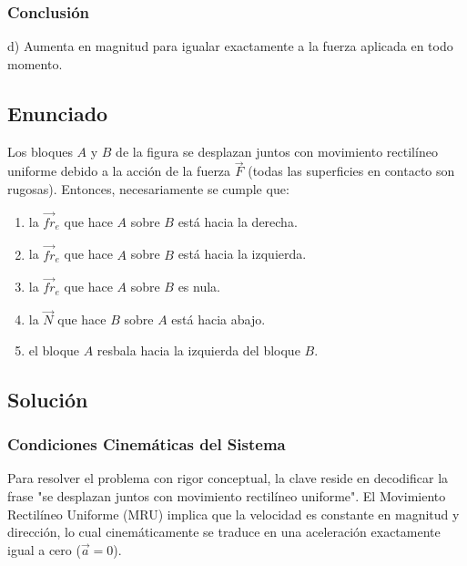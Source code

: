 \documentclass[12pt]{article}
\begin{document}
\subsubsection*{Conclusión}
d) Aumenta en magnitud para igualar exactamente a la fuerza aplicada en todo momento.

\newpage

\subsection*{Enunciado}
Los bloques $A$ y $B$ de la figura se desplazan juntos con movimiento rectilíneo uniforme debido a la acción de la fuerza $\vec{F}$ (todas las superficies en contacto son rugosas). Entonces, necesariamente se cumple que:
\begin{enumerate}
    \item[a)] la $\vec{fr}_e$ que hace $A$ sobre $B$ está hacia la derecha.
    \item[b)] la $\vec{fr}_e$ que hace $A$ sobre $B$ está hacia la izquierda.
    \item[c)] la $\vec{fr}_e$ que hace $A$ sobre $B$ es nula.
    \item[d)] la $\vec{N}$ que hace $B$ sobre $A$ está hacia abajo.
    \item[e)] el bloque $A$ resbala hacia la izquierda del bloque $B$.
\end{enumerate}

\begin{center}
\end{center}

\subsection*{Solución}

\subsubsection*{Condiciones Cinemáticas del Sistema}
Para resolver el problema con rigor conceptual, la clave reside en decodificar la frase "se desplazan juntos con movimiento rectilíneo uniforme". El Movimiento Rectilíneo Uniforme (MRU) implica que la velocidad es constante en magnitud y dirección, lo cual cinemáticamente se traduce en una aceleración exactamente igual a cero ($\vec{a} = 0$).
\end{document}
